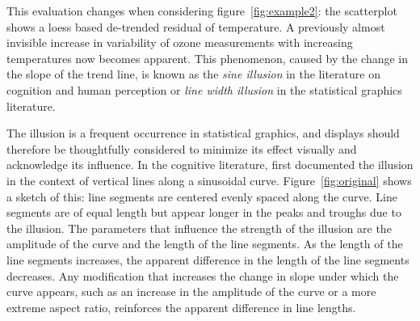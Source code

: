 \documentclass[12pt]{article}\usepackage[]{graphicx}\usepackage[]{color}
\begin{document}
This evaluation changes when considering figure~\ref{fig:example2}: the scatterplot shows a loess based de-trended residual of temperature. A previously almost invisible increase in variability of ozone measurements with increasing temperatures now becomes apparent.
This phenomenon, caused by the change in the slope of the trend line,  is  known as the  {\it sine illusion} in the literature on cognition and human perception  or {\it line width illusion} in the statistical graphics literature. 



The illusion is a frequent occurrence in statistical graphics, and  displays should therefore be thoughtfully considered to minimize its effect visually and acknowledge its influence. 
In the cognitive literature, \cite{day:1991} first documented the illusion in the context of vertical lines along a sinusoidal curve. Figure~\ref{fig:original} shows a sketch of this: line segments are centered evenly spaced along the curve. Line segments are of equal length but appear longer in the peaks and troughs due to the illusion. 
The parameters that influence the strength of the illusion are the amplitude of the curve and the length of the line segments.
As the length of the line segments increases,  the apparent difference in the length of the line segments decreases. Any modification that increases the change in slope under which the curve appears, such as an increase in the amplitude of the curve or a more extreme aspect ratio, reinforces the apparent difference in line lengths. 
\end{document}
